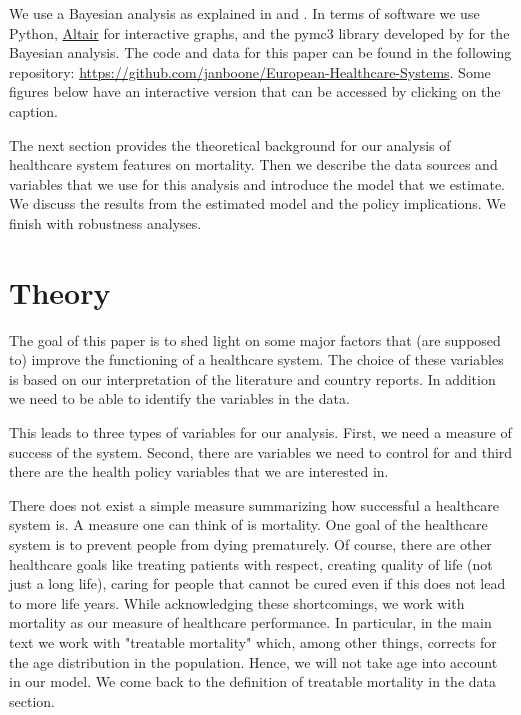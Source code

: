 \documentclass[12pt,english,a4paper]{article}
\begin{document}
We use a Bayesian analysis as explained in \cite{mcelreath} and \cite{GelmanBook}. In terms of software we use Python, \href{https://altair-viz.github.io/}{Altair} for interactive graphs, and the pymc3 library developed by \cite{pymc3} for the Bayesian analysis. The code and data for this paper can be found in the following repository: \url{https://github.com/janboone/European-Healthcare-Systems}. Some figures below have an interactive version that can be accessed by clicking on the caption.

The next section provides the theoretical background for our analysis of healthcare system features on mortality. Then we describe the data sources and variables that we use for this analysis and introduce the model that we estimate. We discuss the results from the estimated model and the policy implications. We finish with robustness analyses.



\section{Theory}
\label{sec:orge15d8f2}
\label{sec:theory}

The goal of this paper is to shed light on some major factors that (are supposed to) improve the functioning of a healthcare system. The choice of these variables is based on our interpretation of the literature and country reports. In addition we need to be able to identify the variables in the data.

This leads to three types of variables for our analysis. First, we need a measure of success of the system. Second, there are variables we need to control for and third there are the health policy variables that we are interested in.

There does not exist a simple measure summarizing how successful a healthcare system is. A measure one can think of is mortality. One goal of the healthcare system is to prevent people from dying prematurely. Of course, there are other healthcare goals like treating patients with respect, creating quality of life (not just a long life), caring for people that cannot be cured even if this does not lead to more life years. While acknowledging these shortcomings, we work with mortality as our measure of healthcare performance. In particular, in the main text we work with "treatable mortality" which, among other things, corrects for the age distribution in the population. Hence, we will not take age into account in our model. We come back to the definition of treatable mortality in the data section. 
\end{document}
